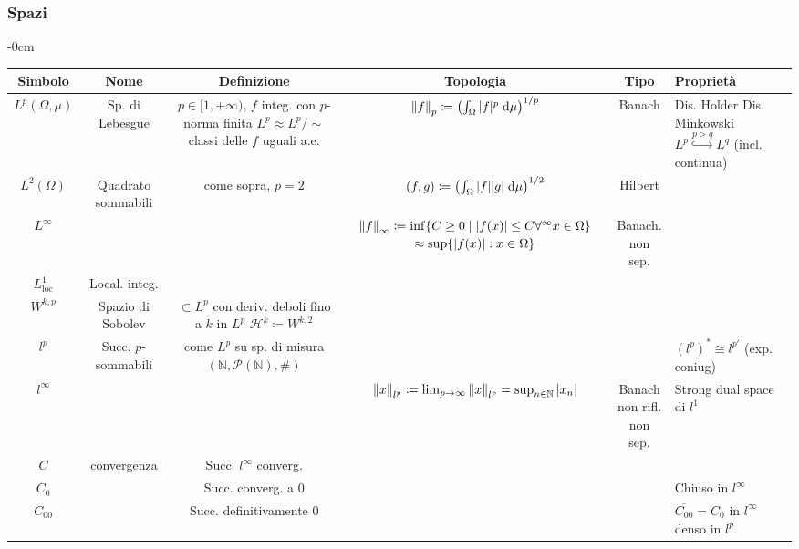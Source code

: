\documentclass[a4paper,10pt]{article}
\theoremstyle{definition}
\newcommand{\na}{\mathbb{N}} %
\newcommand{\inj}{\hookrightarrow} %
\newcommand{\hil}{\mathcal{H}} %
\theoremstyle{indentdefinition}
\theoremstyle{indenttheorem}
\theoremstyle{myremark}
\theoremstyle{indentgeneral}
\begin{document}
\begin{landscape}
\subsubsection{Spazi}
\begin{adjustwidth}{}{-0cm}
\begin{table}[H]
    \centering
    \begin{tabular}{|c|c|c|c|c|l|}\hline
         Simbolo&  Nome&  Definizione&  Topologia& Tipo&Proprietà\\ \hline\hline
 $L^p(\Omega,\mu)$& Sp. di Lebesgue& \shortstack{$p\in[1,+\infty)$, $f$ integ. con $p$-norma finita\\
 $L^p\approx L^p/\sim$ classi delle $f$ uguali a.e.}& $\norm{f}_p\coloneqq\left(\int _{\Omega}|f|^{p}\;\mathrm {d} \mu \right)^{1/p}$ & Banach& \shortstack{
      Dis. Holder \\
      Dis. Minkowski \\
      $L^p\overset{p>q}{\inj} L^q$ (incl. continua)}\\ \hline 
 $L^2(\Omega)$& Quadrato sommabili& come sopra, $p=2$ & $(f,g)\coloneqq\left(\int _{\Omega}\abs{f}\abs{g}\;\mathrm {d} \mu \right)^{1/2}$ & Hilbert&\\ \hline 
 $L^\infty$& & & \shortstack{$\norm{f}_\infty\coloneqq\inf\{C\ge0\mid\abs{f(x)}\le C\forall^\infty x\in\Omega\}$\\
 $\approx\sup\{\abs{f(x)}:x\in\Omega\}$}& \shortstack{Banach.\\non sep.}&\\ \hline
  $L_{\text{loc}}^1$& Local. integ. & & & &\\\hline
 $W^{k,p}$& Spazio di Sobolev& \shortstack{$\subset  L^p$ con deriv. 
 deboli fino a $k$ in $L^p$\\$\hil^k\coloneqq W^{k,2}$}& & &\\\hline \hline
 $l^p$& Succ.  $p$-sommabili& come $L^p$ su sp. di misura $(\na,\mathscr{P}(\na),\#)$& & &$(l^p)^*\cong l^{p'}$ (exp. coniug)\\ \hline 
 $l^\infty$& & & $\norm{x}_{l^p}\coloneqq\lim_{p\to\infty}\norm{x}_{l^p}=\sup_{n\in\na}\abs{x_n}$& \shortstack{Banach\\non rifl.\\non sep.}&Strong dual space di $l^1$\\\hline  
 $C$& convergenza& Succ. $l^\infty$ converg.& & &\\ \hline 
 $C_0$& & Succ. converg. a 0& & &Chiuso in $l^\infty$\\\hline
 $C_{00}$& & Succ. definitivamente 0& & &\shortstack{$\overline{C_{00}}=C_0$ in $l^\infty$\\denso in $l^p$ }\\\hline\hline

\end{tabular}
\end{table}
\end{adjustwidth}
\end{landscape}
\end{document}
